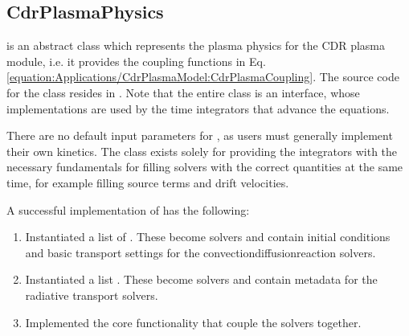 \documentclass[letterpaper,10pt,english]{sphinxmanual}
\begin{document}
\subsection{CdrPlasmaPhysics}
\label{\detokenize{Applications/CdrPlasmaModel:cdrplasmaphysics}}\label{\detokenize{Applications/CdrPlasmaModel:chap-cdrplasmaphysics}}
{\hyperref[\detokenize{Applications/CdrPlasmaModel:chap-cdrplasmaphysics}]{}} is an abstract class which represents the plasma physics for the CDR plasma module, i.e. it provides the coupling functions in Eq. \ref{equation:Applications/CdrPlasmaModel:CdrPlasmaCoupling}.
The source code for the class resides in .
Note that the entire class is an interface, whose implementations are used by the time integrators that advance the equations.

There are no default input parameters for {\hyperref[\detokenize{Applications/CdrPlasmaModel:chap-cdrplasmaphysics}]{}}, as users must generally implement their own kinetics.
The class exists solely for providing the integrators with the necessary fundamentals for filling solvers with the correct quantities at the same time, for example filling source terms and drift velocities.

A successful implementation of {\hyperref[\detokenize{Applications/CdrPlasmaModel:chap-cdrplasmaphysics}]{}} has the following:
\begin{enumerate}
%
\item {} 
Instantiated a list of {\hyperref[\detokenize{Solvers/CDR:chap-cdrspecies}]{}}.
These become {\hyperref[\detokenize{Solvers/CDR:chap-cdr}]{}} solvers and contain initial conditions and basic transport settings for the convection\sphinxhyphen{}diffusion\sphinxhyphen{}reaction solvers.

\item {} 
Instantiated a list {\hyperref[\detokenize{Solvers/RTE:chap-rtspecies}]{}}.
These become {\hyperref[\detokenize{Solvers/RTE:chap-radiativetransfer}]{}} solvers and contain metadata for the radiative transport solvers.

\item {} 
Implemented the core functionality that couple the solvers together.

\end{enumerate}
\end{document}
